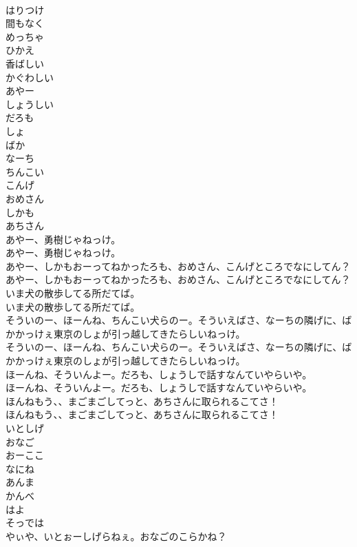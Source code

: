 \documentclass[8pt]{extreport}
\begin{document}
\begin{CJK}{UTF8}{min}
\\	はりつけ
\\	間もなく
\\	めっちゃ
\\	ひかえ
\\	香ばしい
\\	かぐわしい
\\	あやー
\\	しょうしい
\\	だろも
\\	しょ
\\	ばか
\\	なーち
\\	ちんこい
\\	こんげ
\\	おめさん
\\	しかも
\\	あちさん
\\	あやー、勇樹じゃねっけ。	
\\	あやー、勇樹じゃねっけ。 
\\	あやー、しかもおーってねかったろも、おめさん、こんげところでなにしてん？	
\\	あやー、しかもおーってねかったろも、おめさん、こんげところでなにしてん？ 
\\	いま犬の散歩してる所だてば。	
\\	いま犬の散歩してる所だてば。 
\\	そういのー、ほーんね、ちんこい犬らのー。そういえばさ、なーちの隣げに、ばかかっけぇ東京のしょが引っ越してきたらしいねっけ。	
\\	そういのー、ほーんね、ちんこい犬らのー。そういえばさ、なーちの隣げに、ばかかっけぇ東京のしょが引っ越してきたらしいねっけ。 
\\	ほーんね、そういんよー。だろも、しょうしで話すなんていやらいや。	
\\	ほーんね、そういんよー。だろも、しょうしで話すなんていやらいや。 
\\	ほんねもう、、まごまごしてっと、あちさんに取られるこてさ！	
\\	ほんねもう、、まごまごしてっと、あちさんに取られるこてさ！ 
\\	いとしげ
\\	おなご
\\	おーここ
\\	なにね
\\	あんま
\\	かんべ
\\	はよ
\\	そっでは
\\	やぃや、いとぉーしげらねぇ。おなごのこらかね？	

\end{CJK}
\end{document}
